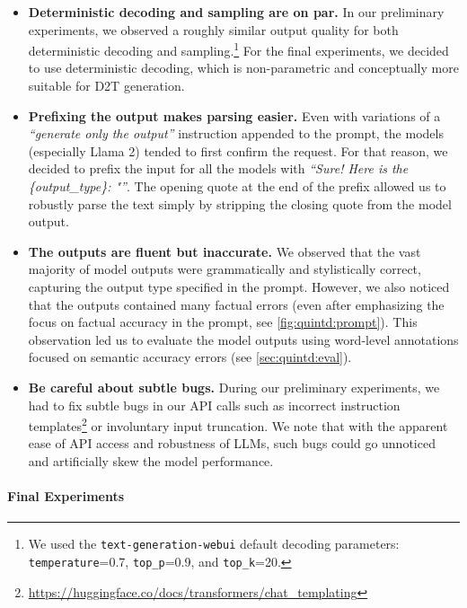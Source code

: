 \begin{itemize}
    \item\textbf{Deterministic decoding and sampling are on par.} In our preliminary experiments, we observed a roughly similar output quality for both deterministic decoding and sampling.\footnote{We used the \texttt{text-generation-webui} default decoding parameters: \texttt{temperature}=0.7, \texttt{top\_p}=0.9, and \texttt{top\_k}=20.} For the final experiments, we decided to use deterministic decoding, which is non-parametric and conceptually more suitable for D2T generation.

    \item\textbf{Prefixing the output makes parsing easier.} Even with variations of a \textit{``generate only the output''} instruction appended to the prompt, the models (especially Llama 2) tended to first confirm the request. For that reason, we decided to prefix the input for all the models with \textit{``Sure! Here is the \{output\_type\}: "''}. The opening quote at the end of the prefix allowed us to robustly parse the text simply by stripping the closing quote from the model output.

    \item\textbf{The outputs are fluent but inaccurate.} We observed that the vast majority of model outputs were grammatically and stylistically correct, capturing the output type specified in the prompt. However, we also noticed that the outputs contained many factual errors (even after emphasizing the focus on factual accuracy in the prompt, see \autoref{fig:quintd:prompt}). This observation led us to evaluate the model outputs using word-level annotations focused on semantic accuracy errors (see \autoref{sec:quintd:eval}).


    \item\textbf{Be careful about subtle bugs.} During our preliminary experiments, we had to fix subtle bugs in our API calls such as incorrect instruction templates\footnote{\url{https://huggingface.co/docs/transformers/chat_templating}} or involuntary input truncation. We note that with the apparent ease of API access and robustness of LLMs, such bugs could go unnoticed and artificially skew the model performance.

\end{itemize}



\paragraph{Final Experiments}
\label{sec:quintd:basic}

